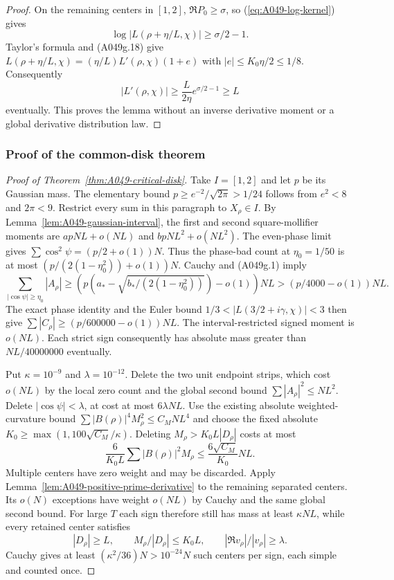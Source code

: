 \begin{proof}
On the remaining centers in $[1,2]$, $\Re P_0\ge\sigma$,
so (\ref{eq:A049-log-kernel}) gives
\[
                 \log|L(\rho+\eta/L,\chi)|\ge\sigma/2-1.
\]
Taylor's formula and (A049g.18) give
$L(\rho+\eta/L,\chi)=(\eta/L)L'(\rho,\chi)(1+e)$
with $|e|\le K_0\eta/2\le1/8$. Consequently
\[
 |L'(\rho,\chi)|\ge \frac{L}{2\eta}e^{\sigma/2-1}\ge L
\]
eventually. This proves the lemma without an inverse
derivative moment or a global derivative distribution law.
\end{proof}

\subsubsection*{Proof of the common-disk theorem}

\begin{proof}[Proof of Theorem~\ref{thm:A049-critical-disk}]
Take $I=[1,2]$ and let $p$ be its Gaussian mass. The elementary
bound $p\ge e^{-2}/\sqrt{2\pi}>1/24$ follows from $e^2<8$
and $2\pi<9$. Restrict every sum in this paragraph to $X_\rho\in I$.
By Lemma~\ref{lem:A049-gaussian-interval}, the first and second
square-mollifier moments are $apNL+o(NL)$ and
$bpNL^2+o(NL^2)$. The even-phase limit gives
$\sum\cos^2\psi=(p/2+o(1))N$. Thus the phase-bad count
at $\eta_0=1/50$ is at most
$(p/(2(1-\eta_0^2))+o(1))N$. Cauchy and (A049g.1) imply
\[
 \sum_{|\cos\psi|\ge\eta_0}|A_\rho|
     \ge\left(p\left(a_*-
                 \sqrt{b_*/(2(1-\eta_0^2))}\right)-o(1)\right)NL
     > (p/4000-o(1))NL.
\]
The exact phase identity and the Euler bound
$1/3<|L(3/2+i\gamma,\chi)|<3$ then give
$\sum|C_\rho|\ge(p/600000-o(1))NL$. The interval-restricted
signed moment is $o(NL)$. Each strict sign consequently has
absolute mass greater than $NL/40000000$ eventually.

Put $\kappa=10^{-9}$ and $\lambda=10^{-12}$. Delete the two
unit endpoint strips, which cost $o(NL)$ by the local zero
count and the global second bound $\sum|A_\rho|^2\le NL^2$.
Delete $|\cos\psi|<\lambda$, at cost at most $6\lambda NL$.
Use the existing absolute weighted-curvature bound
$\sum|B(\rho)|^4M_\rho^2\le C_MNL^4$ and choose the fixed
absolute $K_0\ge\max(1,100\sqrt{C_M}/\kappa)$. Deleting
$M_\rho>K_0L|D_\rho|$ costs at most
\[
 \frac6{K_0L}\sum |B(\rho)|^2M_\rho
                         \le\frac{6\sqrt{C_M}}{K_0}NL.
\]
Multiple centers have zero weight and may be discarded.
Apply Lemma~\ref{lem:A049-positive-prime-derivative} to the
remaining separated centers. Its $o(N)$ exceptions have
weight $o(NL)$ by Cauchy and the same global second bound.
For large $T$ each sign therefore still has mass at least
$\kappa NL$, while every retained center satisfies
\[
 |D_\rho|\ge L,\qquad M_\rho/|D_\rho|\le K_0L,
 \qquad |\Re v_\rho|/|v_\rho|\ge\lambda.
\tag{A049g.20}
\]
Cauchy gives at least $(\kappa^2/36)N>10^{-24}N$ such
centers per sign, each simple and counted once.


\end{proof}

